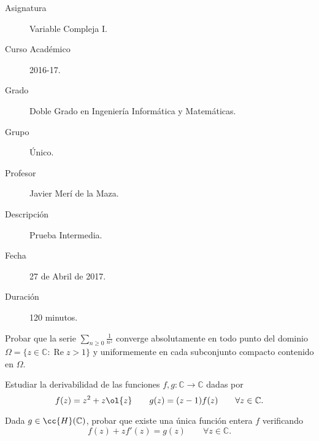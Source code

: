 \documentclass[12pt]{article}
\renewcommand{\Re}{\operatorname{Re}} %
\begin{document}

    
    

    \begin{description}
        \item[Asignatura] Variable Compleja I.
        \item[Curso Académico] 2016-17.
        \item[Grado] Doble Grado en Ingeniería Informática y Matemáticas.
        \item[Grupo] Único.
        \item[Profesor] Javier Merí de la Maza.
        \item[Descripción] Prueba Intermedia.
        \item[Fecha] 27 de Abril de 2017.
        \item[Duración] 120 minutos.
    \end{description}
    \newpage

    \begin{ejercicio}[3.5 puntos]
        Probar que la serie $\displaystyle \sum\limits_{n \geq 0} \frac{1}{n^z}$ converge absolutamente en todo punto del dominio $\Omega = \{z \in \mathbb{C} : \Re z > 1\}$ y uniformemente en cada subconjunto compacto contenido en $\Omega$.
    \end{ejercicio}

    \begin{ejercicio}[3 puntos]
        Estudiar la derivabilidad de las funciones $f , g : \mathbb{C} \to \mathbb{C}$ dadas por
        \[
            f(z) = z^2+z\ol{z} \qquad g(z) = (z - 1) f(z) \qquad \forall z \in \mathbb{C}.
        \]
    \end{ejercicio}

    \begin{ejercicio}[3.5 puntos]
        Dada $g \in \cc{H} (\mathbb{C})$, probar que existe una única función entera $f$ verificando
        \begin{equation*}
            f(z) + z f'(z) = g(z) \qquad \forall z \in \mathbb{C}.
        \end{equation*}
    \end{ejercicio}
\end{document}
